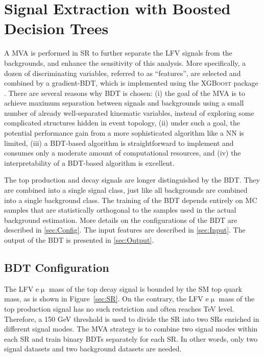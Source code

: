 \chapter{Signal Extraction with Boosted Decision Trees}
\label{chap:BDT}

A \ac{MVA} is performed in \ac{SR} to further separate the LFV signals from the backgrounds, and enhance the sensitivity of this analysis. More specifically, a dozen of discriminating variables, referred to as ``features'', are selected and combined by a gradient-\ac{BDT}, which is implemented using the \textsc{XGBoost} package \cite{Chen:2016:XST:2939672.2939785}. There are several reasons why \ac{BDT} is chosen: (i) the goal of the \ac{MVA} is to achieve maximum separation between signals and backgrounds using a small number of already well-separated kinematic variables, instead of exploring some complicated structures hidden in event topology, (ii) under such a goal, the potential performance gain from a more sophisticated algorithm like a \ac{NN} is limited, (iii) a \ac{BDT}-based algorithm is straightforward to implement and consumes only a moderate amount of computational resources, and (iv) the interpretability of a \ac{BDT}-based algorithm is excellent. 

The top production and decay signals are longer distinguished by the \ac{BDT}. They are combined into a single signal class, just like all backgrounds are combined into a single background class. The training of the \ac{BDT} depends entirely on \ac{MC} samples that are statistically orthogonal to the samples used in the actual background estimation. More details on the configurations of the \ac{BDT} are described in \autoref{sec:Config}. The input features are described in \autoref{sec:Input}. The output of the \ac{BDT} is presented in \autoref{sec:Output}.

\section{BDT Configuration}
\label{sec:Config}

The LFV e$\upmu$ mass of the top decay signal is bounded by the \ac{SM} top quark mass, as is shown in Figure~\ref{sec:SR}. On the contrary, the LFV e$\upmu$ mass of the top production signal has no such restriction and often reaches TeV level. Therefore, a 150 GeV threshold is used to divide the \ac{SR} into two \acp{SR} enriched in different signal modes. The \ac{MVA} strategy is to combine two signal modes within each \ac{SR} and train binary \acp{BDT} separately for each \ac{SR}. In other words, only two signal datasets and two background datasets are needed.
   

